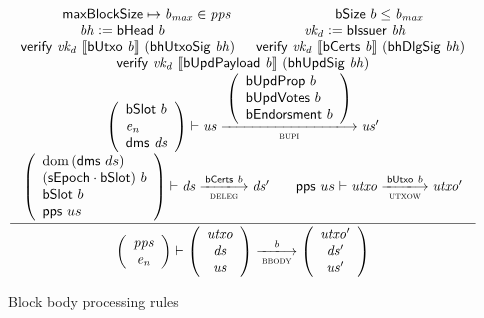 \documentclass[11pt,a4paper]{article}
\DeclareMathOperator{\dom}{dom}
\newcommand{\var}[1]{\mathit{#1}}
\newcommand{\fun}[1]{\mathsf{#1}}
\newcommand{\trans}[2]{\xlongrightarrow[\textsc{#1}]{#2}}
\newcommand{\serialised}[1]{\llbracket \var{#1} \rrbracket}
\newcommand{\leteq}{\ensuremath{\mathrel{\mathop:}=}}
\newcommand{\bsizename}{bSize}
\newcommand{\verifyname}{verify}
\newcommand{\bcertsname}{bCerts}
\newcommand{\bissuername}{bIssuer}
\newcommand{\verify}[3]{\fun{\verifyname} ~ #1 ~ #2 ~ #3}
\newcommand{\bsize}[1]{\fun{\bsizename} ~ #1}
\newcommand{\bcerts}[1]{\fun{\bcertsname} ~ #1}
\newcommand{\bissuer}[1]{\fun{\bissuername} ~ #1}
\begin{document}
\begin{figure}[ht]
  \begin{equation*}
    \inference
    { \maxblocksize \mapsto \var{b_{max}} \in \var{pps} && \bsize{b} \leq \var{b_{max}} \\
      \var{bh} \leteq \bhead{b} & \var{vk_d} \leteq \bissuer{\var{bh}} \\
      \verify{\var{vk_d}}{\serialised{\butxo{b}}}{(\fun{bhUtxoSig}~\var{bh})} &
      \verify{\var{vk_d}}{\serialised{\bcerts{b}}}{(\fun{bhDlgSig}~\var{bh})} \\
      \verify{\var{vk_d}}{\serialised{\bupdpayload{b}}}{(\fun{bhUpdSig}~\var{bh})} \\
      {\left(
          \begin{array}{l}
            \bslot{b} \\
            \var{e_n} \\
            \fun{dms} ~ \var{ds}
          \end{array}
        \right)}
      \vdash \var{us} \trans{bupi}{
        {\left(
            \begin{array}{l}
              \bupdprop{b} \\
              \bupdvotes{b} \\
              \bendorsment{b}
            \end{array}
          \right)}
      } \var{us'}
      \\
      {\left(
          \begin{array}{l}
            \dom{(\fun{dms}~ ds)} \\
            (\fun{\sepochname} \cdot \fun{\bslotname}) ~ b \\
            \bslot{b} \\
            \fun{pps} ~  us \\
          \end{array}
        \right)}
      \vdash \var{ds} \trans{deleg}{\bcerts{b}} \var{ds'} &
      \fun{pps} ~  us \vdash \var{utxo} \trans{utxow}{\butxo{b}} \var{utxo'} \\
    }
    {
      \left(
        {\begin{array}{c}
           \var{pps} \\
           \var{e_n}
         \end{array}}
     \right)
     \vdash
     {
       \left(
         {\begin{array}{c}
            \var{utxo} \\
            \var{ds} \\
            \var{us}
          \end{array}}
      \right)
    }
    \trans{bbody}{\var{b}}
    {
      \left(
        {\begin{array}{c}
           \var{utxo'} \\
           \var{ds'} \\
           \var{us'}
         \end{array}}
     \right)
   }
 }
\end{equation*}
\caption{Block body processing rules}
\label{fig:rules:bbody}
\end{figure}
\end{document}
